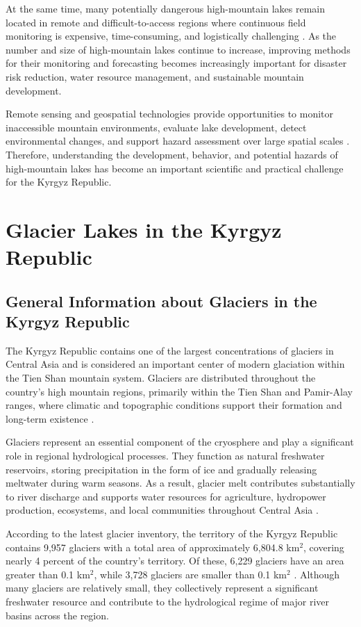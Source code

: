 \documentclass[12pt,a4paper]{report}
\begin{document}
At the same time, many potentially dangerous high-mountain lakes remain located in remote and difficult-to-access regions where continuous field monitoring is expensive, time-consuming, and logistically challenging \cite{Gu2023}. As the number and size of high-mountain lakes continue to increase, improving methods for their monitoring and forecasting becomes increasingly important for disaster risk reduction, water resource management, and sustainable mountain development. 

Remote sensing and geospatial technologies provide opportunities to monitor inaccessible mountain environments, evaluate lake development, detect environmental changes, and support hazard assessment over large spatial scales \cite{Huggel2002}. Therefore, understanding the development, behavior, and potential hazards of high-mountain lakes has become an important scientific and practical challenge for the Kyrgyz Republic.

\section{Glacier Lakes in the Kyrgyz Republic}

\subsection{General Information about Glaciers in the Kyrgyz Republic}

The Kyrgyz Republic contains one of the largest concentrations of glaciers in Central Asia and is considered an important center of modern glaciation within the Tien Shan mountain system. Glaciers are distributed throughout the country’s high mountain regions, primarily within the Tien Shan and Pamir-Alay ranges, where climatic and topographic conditions support their formation and long-term existence \cite{MESKR2024}.

Glaciers represent an essential component of the cryosphere and play a significant role in regional hydrological processes. They function as natural freshwater reservoirs, storing precipitation in the form of ice and gradually releasing meltwater during warm seasons. As a result, glacier melt contributes substantially to river discharge and supports water resources for agriculture, hydropower production, ecosystems, and local communities throughout Central Asia \cite{Sorg2012}. 

According to the latest glacier inventory, the territory of the Kyrgyz Republic contains 9,957 glaciers with a total area of approximately 6,804.8 km$^2$, covering nearly 4 percent of the country’s territory. Of these, 6,229 glaciers have an area greater than 0.1 km$^2$, while 3,728 glaciers are smaller than 0.1 km$^2$ \cite{CAIAG2024}. Although many glaciers are relatively small, they collectively represent a significant freshwater resource and contribute to the hydrological regime of major river basins across the region. 
\end{document}
